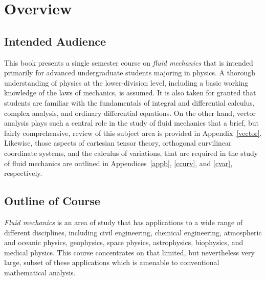 \chapter{Overview}
\section{Intended Audience}
This book presents a single semester course  on {\em fluid mechanics}\/ that is intended primarily for advanced undergraduate students majoring in physics. A thorough  understanding
of physics at the lower-division level, including a basic working
knowledge of the laws of mechanics, is assumed. It is
also taken for granted that students are
 familiar with the fundamentals of integral and differential
calculus,  complex analysis,  and ordinary differential equations. 
On the other hand, vector analysis plays such a central role in the study of fluid
mechanics that a brief, but fairly comprehensive, 
review of this subject area is provided in Appendix~\ref{vector}. 
Likewise, those aspects of cartesian tensor theory, orthogonal curvilinear coordinate systems, and
the calculus of variations, that are required in the study of fluid mechanics are outlined in Appendices~\ref{appb}, \ref{ccurv}, and \ref{cvar}, respectively.

\section{Outline of Course}
{\em Fluid mechanics}\/ is an area of study that has applications to a wide range of different disciplines, including civil
engineering, chemical engineering, atmospheric and oceanic physics, geophysics, space physics, 
astrophysics, biophysics, and medical physics. This course concentrates on that limited, but nevertheless very large, subset of these applications which is amenable to conventional mathematical analysis. 

